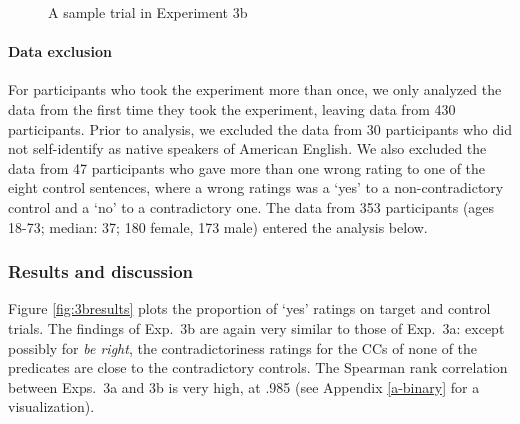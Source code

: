 \documentclass[11pt,fleqn]{article}
\newcommand{\6}{\mbox{$[\hspace*{-.6mm}[$}}
\newcommand{\9}{\mbox{$]\hspace*{-.6mm}]$}}
\begin{document}
{\begin{figure}[h!]
\begin{center}
\end{center}
\caption{A sample trial in Experiment 3b}\label{fig-trial-exp3b}
\end{figure}


\paragraph{Data exclusion} For participants who took the experiment more than once, we only analyzed the data from the first time they took the experiment, leaving data from 430 participants. Prior to analysis, we excluded the data from 30 participants who did not self-identify as native speakers of American English. We also excluded the data from 47 participants who gave more than one wrong rating to one of the eight control sentences, where a wrong ratings was a `yes' to a non-contradictory control and a `no' to a contradictory one. The data from 353 participants (ages 18-73; median: 37; 180 female, 173 male) entered the analysis below. 
    


\subsubsection{Results and discussion}

Figure \ref{fig:3bresults} plots the proportion of `yes' ratings on target and control trials. The findings of Exp.~3b are again very similar to those of Exp.~3a: except possibly for {\em be right}, the contradictoriness ratings for the CCs of none of the predicates are close to the contradictory controls. The Spearman rank correlation between Exps.~3a and 3b is very high, at .985 (see Appendix \ref{a-binary} for a visualization).

}
\end{document}

